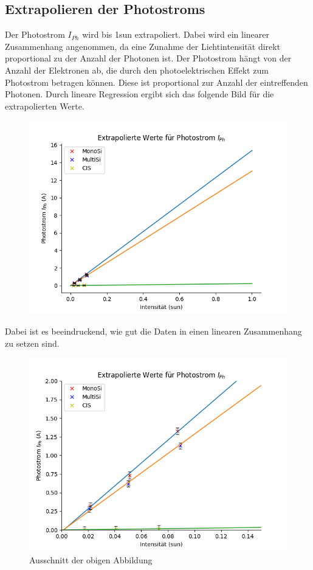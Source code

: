 \subsection{Extrapolieren der Photostroms}

Der Photostrom $I_{Ph}$ wird bis 1sun extrapoliert. Dabei wird ein linearer Zusammenhang angenommen, da eine Zunahme der Lichtintensität direkt proportional zu der 
Anzahl der Photonen ist. Der Photostrom hängt von der Anzahl der Elektronen ab, die durch den photoelektrischen Effekt zum Photostrom betragen können. Diese ist proportional zur 
Anzahl der eintreffenden Photonen. Durch lineare Regression ergibt sich das folgende Bild für die extrapolierten Werte.
\begin{figure}[ht]
    \centering
    \includegraphics[width = 12cm]{Bilder/ExtrapolierteIPh.png}
\end{figure} 

Dabei ist es beeindruckend, wie gut die Daten in einen linearen Zusammenhang zu setzen sind.


\begin{figure}[ht]
    \centering
    \includegraphics[width = 12cm]{Bilder/ExtrapolierteIPhAusschnitt.png}
    \caption{Ausschnitt der obigen Abbildung}
\end{figure} 
